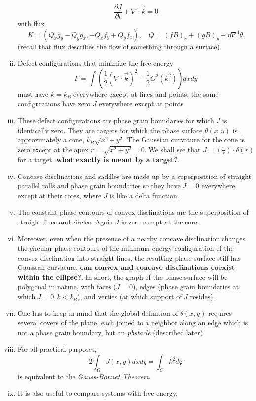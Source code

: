 \documentclass[12pt]{article}
\begin{document}
\begin{enumerate}[(i)]
    \[
        \frac{\partial J}{\partial t}+\nabla \cdot \vec{k} = 0
    \] 
    with flux
    \[
        K = (Q_xg_y-Q_yg_x,-Q_xf_y+Q_yf_x), \quad Q=(fB)_x + (gB)_y + \eta\nabla^4\theta.
    \] 
    (recall that flux describes the flow of something through a surface).
\item Defect configurations that minimize the free energy
    \[
        F = \int \left( \frac{1}{2}(\nabla \cdot \vec{k})^2 + \frac{1}{2}G^2(k^2) \right)dxdy
    \] 
    must have $k=k_B$ everywhere except at lines and points, the same configurations have zero $J$ everywhere except at points.
\item These defect configurations are phase grain boundaries for which $J$ is identically zero. They are targets for which the phase surface $\theta(x,y)$ is approximately a cone, $k_B\sqrt{x^2+y^2}$. The Gaussian curvature for the cone is zero except at the apex $r=\sqrt{x^2+y^2}=0$. We shall see that $J=(\frac{\pi}{r})\cdot \delta(r)$ for a target. \textbf{what exactly is meant by a target?}.
\item Concave disclinations and saddles are made up by a superposition of straight parallel rolls and phase grain boundaries so they have $J=0$ everywhere except at their cores, where $J$ is like a delta function.
\item The constant phase contours of convex disclinations are the superposition of straight lines and circles. Again $J$ is zero except at the core. 
\item Moreover, even when the presence of a nearby concave disclination changes the circular phase contours of the minimum energy configuration of the convex disclination into straight lines, the resulting phase surface still has Gaussian curvature. \textbf{can convex and concave disclinations coexist within the ellipse?}. In short, the graph of the phase surface will be polygonal in nature, with faces ($J=0$), edges (phase grain boundaries at which $J=0, k<k_B$), and verties (at which support of $J$ resides).
\item One has to keep in mind that the global definition of $\theta(x,y)$ requires several covers of the plane, each joined to a neighbor along an edge which is not a phase grain boundary, but an \emph{pbstacle} (described later).
\item For all practical purposes,
    \[
        2\int_{\Omega}J(x,y)dxdy = \int_{C}k^2d\varphi
    \] 
    is equivalent to the \emph{Gauss-Bonnet Theorem}.
\item It is also useful to compare systems with free energy,

\end{enumerate}
\end{document}
